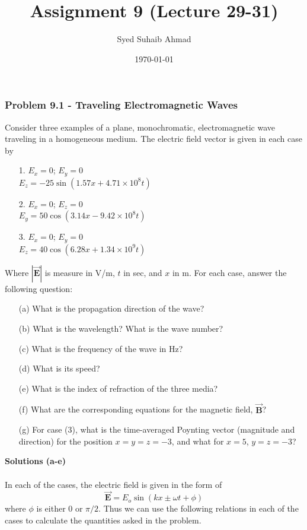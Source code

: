 \documentclass{article}
\title{Assignment \textbf{9} (Lecture 29-31)
}
\author{Syed Suhaib Ahmad}
\date{\today}
\begin{document}
\maketitle


\subsubsection*{Problem 9.1 - Traveling Electromagnetic Waves}
Consider three examples of a plane, monochromatic, electromagnetic wave traveling in a homogeneous medium. The electric field vector is given in each case by
\begin{enumerate}
    \item[1.]$E_x=0$; $E_y=0$
                  \\$E_z=-25\sin(1.57x+4.71\times10^8t)$
    \item[2.]$E_x=0$; $E_z=0$
                  \\$E_y=50\cos(3.14x-9.42\times10^8t)$
    \item[3.]$E_x=0$; $E_y=0$
                  \\$E_z=40\cos(6.28x+1.34\times10^9t)$
\end{enumerate}
Where $|\boldsymbol{\vec{E}}|$ is measure in V/m, $t$ in sec, and $x$ in m. For each case, answer the following question:
\begin{enumerate}
    \item[(a)]What is the propagation direction of the wave?
    \item[(b)]What is the wavelength? What is the wave number?
    \item[(c)]What is the frequency of the wave in Hz?
    \item[(d)]What is its speed?
    \item[(e)]What is the index of refraction of the three media?
    \item[(f)]What are the corresponding equations for the magnetic field, $\boldsymbol{\vec{B}}$?
    \item[(g)]For case (3), what is the time-averaged Poynting vector (magnitude and direction) for the position $x=y=z=-3$, and what for $x=5$, $y=z=-3$?
\end{enumerate}
\textbf{Solutions (a-e)}
\\
\\In each of the cases, the electric field is given in the form of 
\[\boldsymbol{\vec{E}}=E_o\sin(kx\pm\omega t+\phi)\]
where $\phi$ is either $0$ or $\pi/2$. Thus we can use the following relations in each of the cases to calculate the quantities asked in the problem.
\end{document}

